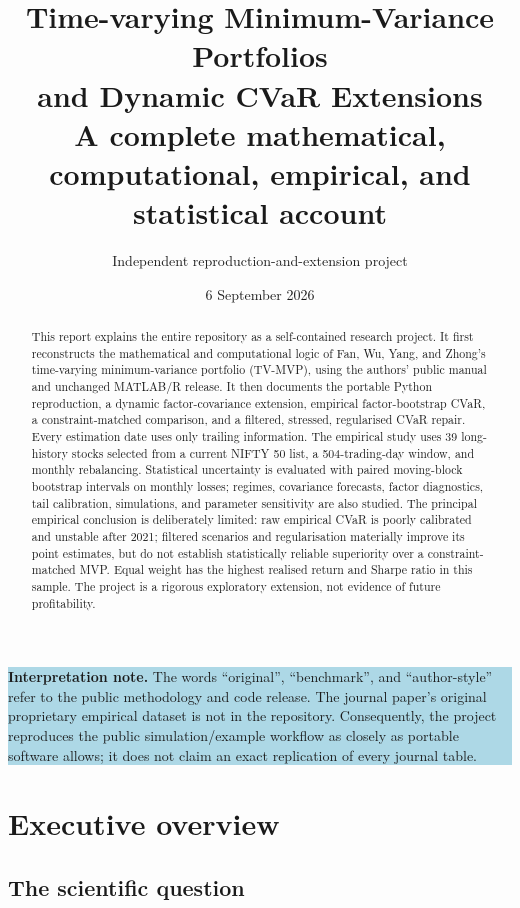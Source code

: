 \documentclass[11pt,a4paper]{article}
\title{\vspace{-1.2cm}\textbf{Time-varying Minimum-Variance Portfolios\\and Dynamic CVaR Extensions}\\[0.5em]
\large A complete mathematical, computational, empirical, and statistical account}
\author{Independent reproduction-and-extension project}
\date{6 September 2026}
\newcommand{\noteBox}[1]{%
  \begin{center}\colorbox{lightblue}{\parbox{0.93\linewidth}{\textbf{Interpretation note.} #1}}\end{center}}
\begin{document}
\maketitle

\begin{abstract}
This report explains the entire repository as a self-contained research project. It first reconstructs the mathematical and computational logic of Fan, Wu, Yang, and Zhong's time-varying minimum-variance portfolio (TV-MVP), using the authors' public manual and unchanged MATLAB/R release. It then documents the portable Python reproduction, a dynamic factor-covariance extension, empirical factor-bootstrap CVaR, a constraint-matched comparison, and a filtered, stressed, regularised CVaR repair. Every estimation date uses only trailing information. The empirical study uses 39 long-history stocks selected from a current NIFTY 50 list, a 504-trading-day window, and monthly rebalancing. Statistical uncertainty is evaluated with paired moving-block bootstrap intervals on monthly losses; regimes, covariance forecasts, factor diagnostics, tail calibration, simulations, and parameter sensitivity are also studied. The principal empirical conclusion is deliberately limited: raw empirical CVaR is poorly calibrated and unstable after 2021; filtered scenarios and regularisation materially improve its point estimates, but do not establish statistically reliable superiority over a constraint-matched MVP. Equal weight has the highest realised return and Sharpe ratio in this sample. The project is a rigorous exploratory extension, not evidence of future profitability.
\end{abstract}

\noteBox{The words ``original'', ``benchmark'', and ``author-style'' refer to the public methodology and code release. The journal paper's original proprietary empirical dataset is not in the repository. Consequently, the project reproduces the public simulation/example workflow as closely as portable software allows; it does not claim an exact replication of every journal table.}

\tableofcontents
\listoftables
\listoffigures
\clearpage

\section{Executive overview}

\subsection{The scientific question}
\end{document}
